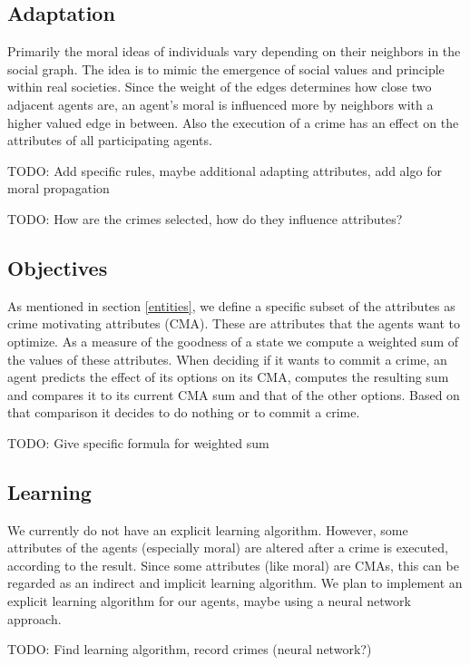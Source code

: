 \documentclass{article}
\begin{document}
		\subsection{Adaptation}
			Primarily the moral ideas of individuals vary depending on their neighbors in the
			social graph. The idea is to mimic the emergence of social values and principle
			within real societies. Since the weight of the edges determines how close two adjacent
			agents are, an agent's moral is influenced more by neighbors with a higher valued
			edge in between.
			Also the execution of a crime has an effect on the attributes
			of all participating agents.
			\\\par
			TODO: Add specific rules, maybe additional adapting attributes, add algo for
				moral propagation
			\par
			TODO: How are the crimes selected, how do they influence attributes?

		\subsection{Objectives}
			As mentioned in section \ref{entities}, we define a specific subset of the attributes as crime
			motivating attributes (CMA). These are attributes that the agents want to optimize. As
			a measure of the goodness of a state we compute a weighted sum of the values of these
			attributes. When deciding if it wants to commit a crime, an agent predicts the effect
			of its options on its CMA, computes the resulting sum and compares it to its current
			CMA sum and that of the other options. Based on that comparison it decides to do
			nothing or to commit a crime.
			\\\par TODO: Give specific formula for weighted sum

		\subsection{Learning}
			We currently do not have an explicit learning algorithm. However,
			some attributes of the agents (especially moral) are altered after a crime is executed,
			according to the result. Since some attributes (like moral) are CMAs, this can be
			regarded as an indirect and implicit learning algorithm.
			We plan to implement an explicit learning algorithm for our agents, maybe using a
			neural network approach.
			\\\par
			TODO: Find learning algorithm, record crimes (neural network?)
\end{document}
